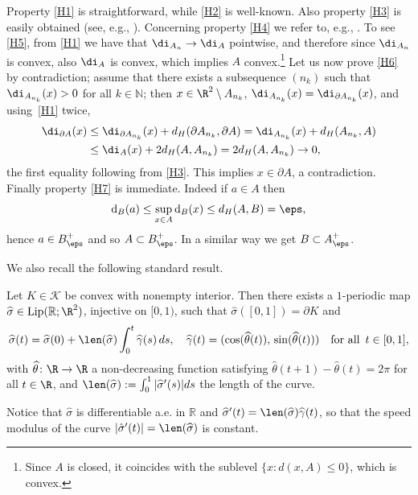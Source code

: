 \begin{remark}
Property \ref{H1} is straightforward, while \ref{H2} is well-known. Also property \ref{H3} is easily obtained (see, e.g., \cite{W}).
Concerning property \ref{H4} we refer to, e.g., \cite[Cor.\,2]{AF}.
To see \ref{H5}, from \ref{H1} we have that $\di_{A_n} \to \di_A$ pointwise,
and therefore since $\di_{A_n}$ is convex, also $\di_A$ is convex, which implies $A$ convex.\footnote{Since $A$ is closed, it
coincides with the sublevel $\{x:d(x,A)\leq 0\}$, which is convex.}
Let us now prove \ref{H6} by contradiction;
assume that there exists a subsequence $(n_k)$ such that $\di_{A_{n_k}}(x)>0$
for all $k\in \mathbb N$; then $x\in \R^2\setminus A_{n_k}$,
$\di_{A_{n_k}}(x)=\di_{\partial A_{n_k}}(x) $, and using~\ref{H1} twice,
\begin{align*}
\di_{\partial A}(x)&\leq \di_{\partial A_{n_k}}(x)+
d_H(\partial A_{n_k},\partial A)=\di_{A_{n_k}}(x)+d_H( A_{n_k},A)\\
&\leq \di_A(x)+ 2d_H(A, A_{n_k})=2d_H(A, A_{n_k})\to0,
\end{align*}
the first equality following from \ref{H3}.
This implies $x\in \partial A$, a contradiction. Finally property \ref{H7} is immediate. Indeed if $a\in A$ then
\begin{equation*}
\mathrm{d}_B(a)\le \sup_{x\in A} \mathrm{d}_B(x)\le d_H(A,B)=\eps,
\end{equation*}
hence $a\in B_\eps^+$ and so $A\subset B_\eps^+$. In a similar way we get $B\subset A_\eps^+$.
\end{remark}

We also recall the following standard result.

\begin{lemma}\label{lm:charact_convex_sets}
Let $K\in\mathcal K$ be convex with nonempty interior.
Then there exists a $1$-periodic map $\widehat \sigma\in {\rm{Lip}}(\mathbb R;\R^2)$, injective on $[0,1)$, such that $\widehat \sigma([0,1])=\partial K$ and
\begin{equation*}
\widehat\sigma(t)=\widehat \sigma(0)+\len(\widehat\sigma)\int_0^t\widehat \gamma(s)\,ds,\quad \widehat\gamma(t)=(\cos(\widehat\theta(t)),\,\sin(\widehat\theta(t)))\quad \text{for all }\, t\in[0,1],
\end{equation*}
with $\widehat \theta\colon\R\to\R$ a non-decreasing function satisfying $\widehat \theta(t+1)-\widehat \theta(t)=2\pi$ for all $t\in\R$, and
$\len(\widehat\sigma):=\int_0^1|\widehat \sigma'(s)|ds$ the length of the curve.
\end{lemma}
Notice that $\widehat \sigma$ is differentiable a.e. in $\mathbb R$ and $\widehat \sigma'(t)=\len(\widehat\sigma)\widehat \gamma(t)$, so that the speed modulus of the curve
$|\hat\sigma'(t)|=\len(\widehat\sigma)$ is constant.

